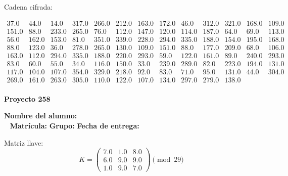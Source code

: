 \documentclass[12pt]{article}
\begin{document}
Cadena cifrada:
\begin{center}
$\begin{array}{lllllllllllll}
37.0 & 44.0 & 14.0 & 317.0 & 266.0 & 212.0 & 163.0 & 172.0 & 46.0 & 312.0 & 321.0 & 168.0 & 109.0\\
151.0 & 88.0 & 233.0 & 265.0 & 76.0 & 112.0 & 147.0 & 120.0 & 114.0 & 187.0 & 64.0 & 69.0 & 113.0\\
56.0 & 162.0 & 153.0 & 81.0 & 351.0 & 339.0 & 228.0 & 294.0 & 335.0 & 188.0 & 154.0 & 195.0 & 168.0\\
88.0 & 123.0 & 36.0 & 278.0 & 265.0 & 130.0 & 109.0 & 151.0 & 88.0 & 177.0 & 209.0 & 68.0 & 106.0\\
163.0 & 112.0 & 294.0 & 335.0 & 188.0 & 220.0 & 293.0 & 59.0 & 122.0 & 161.0 & 89.0 & 240.0 & 293.0\\
83.0 & 60.0 & 55.0 & 34.0 & 116.0 & 150.0 & 33.0 & 239.0 & 289.0 & 82.0 & 223.0 & 194.0 & 131.0\\
117.0 & 104.0 & 107.0 & 354.0 & 329.0 & 218.0 & 92.0 & 83.0 & 71.0 & 95.0 & 131.0 & 44.0 & 304.0\\
269.0 & 161.0 & 263.0 & 305.0 & 110.0 & 122.0 & 107.0 & 134.0 & 297.0 & 279.0 & 138.0\\
\end{array}$
\end{center}

\newpage


\textbf{Proyecto 258}

\textbf{Nombre del alumno:} \underline{\hspace{13cm}}\\\
\vspace{1cm}
\textbf{Matrícula:} \underline{\hspace{4cm}} \hspace{1cm}
\textbf{Grupo:} \underline{\hspace{2cm}}
\textbf{Fecha de entrega:} \underline{\hspace{2cm}}

\medskip

Matriz llave:
\[
K = \begin{pmatrix}
7.0 & 1.0 & 8.0\\
6.0 & 9.0 & 9.0\\
1.0 & 9.0 & 7.0
\end{pmatrix} \pmod{29}
\]
\end{document}
